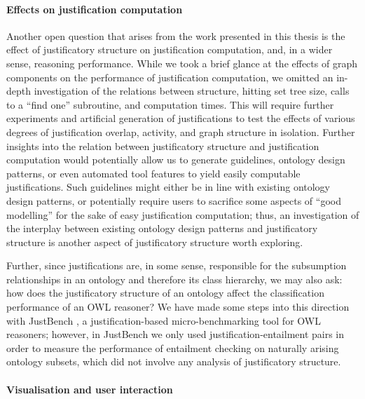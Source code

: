 \paragraph{Effects on justification computation}

Another open question that arises from the work presented in this thesis is the effect of justificatory structure on justification computation, and, in a wider sense, reasoning performance. While we took a brief glance at the effects of graph components on the performance of justification computation, we omitted an in-depth investigation of the relations between structure, hitting set tree size, calls to a \enquote{find one} subroutine, and computation times. This will require further experiments and artificial generation of justifications to test the effects of various degrees of justification overlap, activity, and graph structure in isolation.  Further insights into the relation between justificatory structure and justification computation would potentially allow us to generate guidelines, ontology design patterns, or even automated tool features to yield easily computable justifications. Such guidelines might either be in line with existing ontology design patterns, or potentially require users to sacrifice some aspects of \enquote{good modelling} for the sake of easy justification computation; thus, an investigation of  the interplay between existing ontology design patterns and justificatory structure is another aspect of justificatory structure worth exploring.

Further, since justifications are, in some sense, responsible for the subsumption relationships in an ontology and therefore its class hierarchy, we may also ask: how does the justificatory structure of an ontology affect the classification performance of an OWL reasoner? We have made some steps into this direction with JustBench \cite{bail10wb}, a justification-based micro-benchmarking tool for OWL reasoners; however, in JustBench we only used justification-entailment pairs in order to measure the performance of entailment checking on naturally arising ontology subsets, which did not involve any analysis of justificatory structure.


\paragraph{Visualisation and user interaction}

